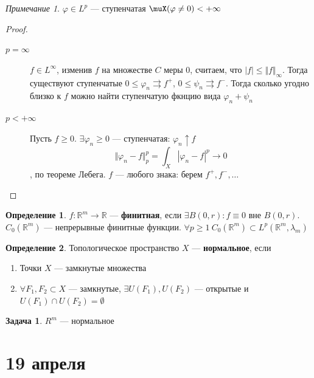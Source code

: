\documentclass[oneside]{book}
\newcommand{\R}{\mathbb{R}}
\theoremstyle{plain}
\theoremstyle{remark}
\newtheorem*{remark}{Примечание}
\theoremstyle{definition}
\newtheorem{task}{Задача}
\newtheorem*{definition}{Определение}
\begin{document}
\begin{remark}
\(\varphi \in L^p\) --- ступенчатая \implies \(\muX(\varphi \neq 0) < +\infty\)
\end{remark}
\begin{proof}
\-
\begin{description}
\item[{\(p = \infty\)}] \(f \in L^\infty\), изменив \(f\) на множестве \(C\) меры \(0\), считаем, что \(|f| \le \Vert f \Vert_\infty\). Тогда существуют ступенчатые \(0\le\varphi_n \rightrightarrows f^+\), \(0 \le \psi_n \rightrightarrows f^-\). Тогда сколько угодно близко к \(f\) можно найти ступенчатую фкнцию вида \(\varphi_n + \psi_n\)
\item[{\(p < +\infty\)}] Пусть \(f \ge 0\). \(\exists \varphi_n \ge 0\) --- ступенчатая: \(\varphi_n \uparrow f\)
\[ \Vert \varphi_n - f \Vert^p_p = \int_X | \varphi_n - f |^p \to 0 \]
, по теореме Лебега. \(f\) --- любого знака: берем \(f^+, f^-, \dots\)
\end{description}
\end{proof}
\begin{definition}
\(f: \R^m \to \R\) --- \textbf{финитная}, если \(\exists B(0, r): f\equiv 0\) вне \(B(0, r)\). \\
\(C_0(\R^m)\) --- непрерывные финитные функции. \(\forall p \ge 1\ C_0(\R^m) \subset L^p(\R^m, \lambda_m)\)
\end{definition}
\begin{definition}
Топологическое пространство \(X\) --- \textbf{нормальное}, если
\begin{enumerate}
\item Точки \(X\) --- замкнутые множества
\item \(\forall F_1, F_2 \subset X\) --- замкнутые, \(\exists U(F_1), U(F_2)\) --- открытые и \(U(F_1)\cap U(F_2) = \emptyset\)
\end{enumerate}
\end{definition}
\begin{task}
\(R^m\) --- нормальное
\end{task}
\chapter{19 апреля}
\label{sec:org5b57e7b}
\newcommand{\rot}{\mathop{\rm rot}\nolimits}
\newcommand{\M}{\mathfrak{M}}
\end{document}
